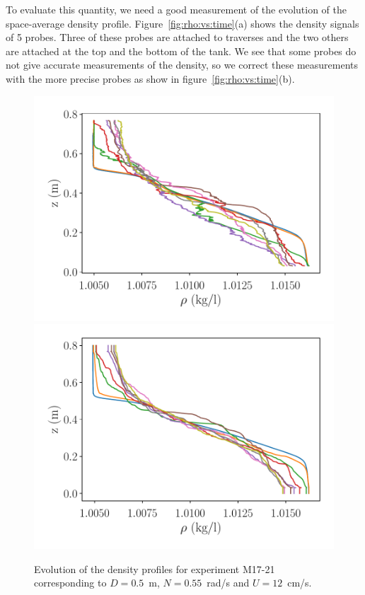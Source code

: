 To evaluate this quantity, we need a good measurement of the evolution of the
space-average density profile. Figure~\ref{fig:rho:vs:time}(a) shows the
density signals of 5 probes. Three of these probes are attached to traverses
and the two others are attached at the top and the bottom of the tank. We see
that some probes do not give accurate measurements of the density, so we
correct these measurements with the more precise probes as show in
figure~\ref{fig:rho:vs:time}(b).

\begin{figure}
\includegraphics[width=\figwidth]{tmp/fig_profiles_mixing}\\
\includegraphics[width=\figwidth]{tmp/fig_profiles_probe_averaged}
\label{fig:profiles:mixing}

\caption{Evolution of the density profiles for experiment M17-21 corresponding
to $D = 0.5$~m, $N=0.55$~rad/s and $U=12$~cm/s.}

\end{figure}

